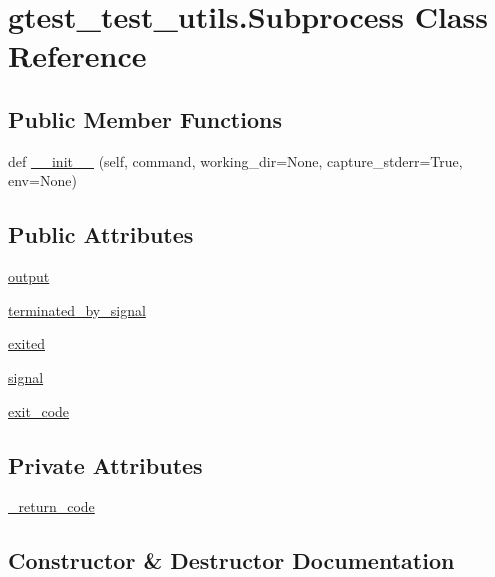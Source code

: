 \hypertarget{classgtest__test__utils_1_1_subprocess}{}\section{gtest\+\_\+test\+\_\+utils.\+Subprocess Class Reference}
\label{classgtest__test__utils_1_1_subprocess}
\subsection*{Public Member Functions}
\begin{DoxyCompactItemize}
\item 
def \mbox{\hyperlink{classgtest__test__utils_1_1_subprocess_a452a9e7d9988cc96e71b6fa09bbaddca}{\+\_\+\+\_\+init\+\_\+\+\_\+}} (self, command, working\+\_\+dir=None, capture\+\_\+stderr=True, env=None)
\end{DoxyCompactItemize}
\subsection*{Public Attributes}
\begin{DoxyCompactItemize}
\item 
\mbox{\hyperlink{classgtest__test__utils_1_1_subprocess_a170f722b867e51f3e97b5b60399988cf}{output}}
\item 
\mbox{\hyperlink{classgtest__test__utils_1_1_subprocess_a9654b9eddd43c93acf66d5c7b0026fca}{terminated\+\_\+by\+\_\+signal}}
\item 
\mbox{\hyperlink{classgtest__test__utils_1_1_subprocess_a020b5fa8268b9eaf1c4a57cbd53c104d}{exited}}
\item 
\mbox{\hyperlink{classgtest__test__utils_1_1_subprocess_af083cd9621a5d5346ffe800191678ea3}{signal}}
\item 
\mbox{\hyperlink{classgtest__test__utils_1_1_subprocess_a01acee4476fd01ccf017d1351cf46c08}{exit\+\_\+code}}
\end{DoxyCompactItemize}
\subsection*{Private Attributes}
\begin{DoxyCompactItemize}
\item 
\mbox{\hyperlink{classgtest__test__utils_1_1_subprocess_ac62600a9ac66eea7d81b37ceb5132bd4}{\+\_\+return\+\_\+code}}
\end{DoxyCompactItemize}


\subsection{Constructor \& Destructor Documentation}
\mbox{\label{classgtest__test__utils_1_1_subprocess_a452a9e7d9988cc96e71b6fa09bbaddca}} 

